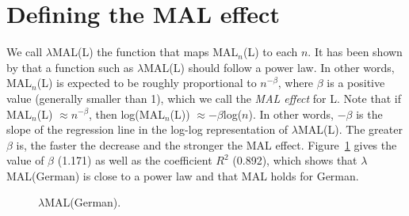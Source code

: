 \section{Defining the MAL effect}\label{metrics}

We call $\lambda$MAL(L) the function that maps MAL$_n$(L) to each $n$. It has been shown by \citet{altmann1980prolegomena} that a function such as $\lambda$MAL(L) should follow a power law. In other words, MAL$_n$(L) is expected to be roughly proportional to $n^{-\beta}$, where $\beta$ is a positive value (generally smaller than 1), which we call the \textit{MAL effect} for L. 
Note that if MAL$_n$(L) $\approx n^{-\beta}$, then log(MAL$_n$(L)) $\approx -\beta$log($n$). In other words, $-\beta$ is the slope of the regression line in the log-log representation of $\lambda$MAL(L). The greater $\beta$ is, the faster the decrease and the stronger the MAL effect. Figure~\ref{fig:German} gives the value of $\beta$ (1.171) as well as the coefficient $R^2$ (0.892), which shows that $\lambda$MAL(German) is close to a power law and that MAL holds for German.

\begin{figure}[!ht]
\begin{center}
\caption{$\lambda$MAL(German).}
\label{fig:German}
\end{center}
\end{figure}


